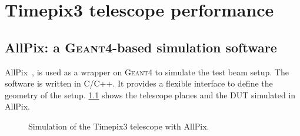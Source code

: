\chapter{Timepix3 telescope performance}
\label{ch:Timepix3Telescope}

\section{AllPix: a \textsc{Geant4}-based simulation software}
AllPix~\cite{allpix}, is used as a wrapper on \textsc{Geant4} to
simulate the test beam setup. The software is written in C/C++. It
provides a flexible interface to define the geometry of the
setup. \cref{fig:TPX3TelescopeAllpix} shows the telescope planes
and the DUT simulated in AllPix.

\begin{figure}[htbp]
  \centering
  \caption{Simulation of the Timepix3 telescope with AllPix.}
  \label{fig:TPX3TelescopeAllpix}
\end{figure}

